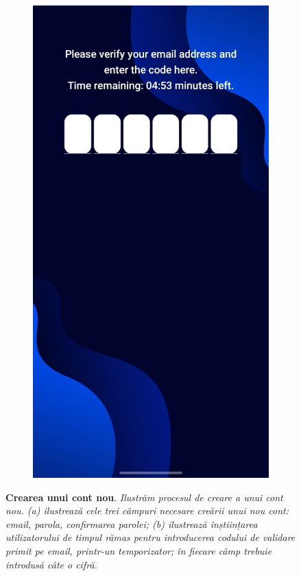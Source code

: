 \begin{figure}[H]
\begin{subfigure}{0.2\textwidth}
  \end{subfigure}
  \begin{subfigure}{0.2\textwidth}
    \includegraphics[width=\linewidth]{images/3-aplicatia-android/validation_code_screen.jpeg}
    \caption{}
    \label{fig:validation_screen}
  \end{subfigure}
  \caption[Crearea unui cont nou]{\textbf{Crearea unui cont nou}. \textit{Ilustrăm procesul de creare a unui cont nou. (a) ilustrează cele trei câmpuri necesare creării unui nou cont: email, parola, confirmarea parolei; (b) ilustrează înștiințarea utilizatorului de timpul rămas pentru introducerea codului de validare primit pe email, printr-un temporizator; în fiecare câmp trebuie introdusă câte o cifră.}}
  \label{fig:sign_up_validation_screens}
\end{figure}


